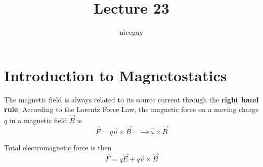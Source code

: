 \documentclass[12pt]{article}
\author{niceguy}
\title{Lecture 23}
\begin{document}
\maketitle

\section{Introduction to Magnetostatics}

The magnetic field is always related to its source current through the \textbf{right hand rule}. According to the Lorentz Force Law, the magnetic force on a moving charge $q$ in a magnetic field $\vec{B}$ is
$$\vec{F} = q\vec{u} \times \vec{B} = -e\vec{u} \times \vec{B}$$

Total electromagnetic force is then
$$\vec{F} = q\vec{E} + q\vec{u} \times \vec{B}$$
\end{document}

